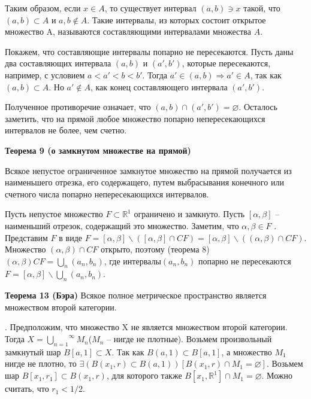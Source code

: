 Таким образом, если $x \in  A$, то существует интервал $(a, b) \ni x$ такой,
что  $(a, b)  \subset A$  и $ a, b  \notin  A$.  Такие  интервалы,  из  которых  состоит
открытое
множество A, называются составляющими интервалами множества $A$.

Покажем, что составляющие интервалы попарно не пересекаются. Пусть даны два
составляющих интервала $(a, b)$ и $(a', b')$, которые пересекаются, например,
с условием $a < a' < b < b'$. Тогда $a' \in  (a, b) \Rightarrow a' \in  A$,
так  как  $(a, b)  \subset A$.  Но  $a' \notin   A$,  как  конец  составляющего  интервала
$(a', b')$.

Полученное противоречие означает, что $(a, b) \cap (a', b') = \varnothing$.
Осталось заметить, что на прямой любое множество попарно непересекающихся интервалов
не более, чем счетно.

\noindent\dotfill
    
\textbf{Теорема 9 (о замкнутом множестве на прямой)}

Всякое непустое ограниченное замкнутое множество на прямой
получается из наименьшего отрезка, его содержащего, путем выбрасывания конечного или
счетного числа попарно непересекающихся интервалов.

Пусть непустое множество $F \subset \mathbb{R}^1$ ограничено и замкнуто. Пусть
$[\alpha, \beta ]$ – наименьший отрезок, содержащий это множество.
Заметим, что $\alpha, \beta
    \in  F$ .  Представим  $F$  в  виде  $F  =  [\alpha, \beta ] \backslash
    ( [\alpha, \beta ] \cap CF )  = [\alpha, \beta ] \backslash ( (\alpha, \beta )
    \cap CF )$.
Множество $(\alpha, \beta ) \cap CF$ открыто, поэтому (теорема 8)
$ (\alpha, \beta )	CF  =\underset{n}{\bigcup}(a_n , b_n )$,
где интервалы$ (a_n, b_n )$ попарно не пересекаются
\Rightarrow $F  = [\alpha , \beta ] \backslash \underset{n}{\bigcup}(a_n , b_n )$.

\noindent\dotfill
    
\textbf{Теорема 13 (Бэра)}
Всякое полное метрическое пространство является множеством второй категории.

\MS. Предположим, что множество X не является множеством второй
категории. Тогда $X  = \stackrel{\infty}{\underset{n=1}{\bigcup}}  M_n$($M_n$ – нигде не плотные).
Возьмем произвольный замкнутый шар $B[a, 1] \subset X$. Так как $B(a, 1) \subset B[a, 1]$,
а множество $M_1$ нигде не плотно, то
$\exists(B(x_1, r) \subset B(a, 1)) [ B(x_1, r) \cap M_1 =\varnothing]$.
Возьмем шар $B[x_1, r_1] \subset B(x_1, r)$, для которого также
$B[x_1, \mathbb{R}^1] \cap M_1 = \varnothing$. Можно считать, что $r_1 < 1/2$.

